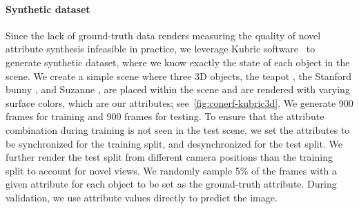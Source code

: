     \paragraph{Synthetic dataset}
      Since the lack of ground-truth data renders measuring the quality of
      novel attribute synthesis infeasible in practice, we leverage Kubric
      software~\cite{kubric2021github} to generate synthetic dataset, where we
      know exactly the state of each object in the scene.
      We create a simple scene where three 3D objects, the teapot
      \cite{teapot}, the Stanford bunny \cite{bunny}, and Suzanne
      \cite{suzanne}, are placed within the scene and are rendered with
      varying surface colors, which are our attributes;
      see~\cref{fig:conerf-kubric3d}.
      We generate 900 frames for training and 900 frames for testing.
      To ensure that the attribute combination during training is not seen in
      the test scene, we set the attributes to be synchronized for the
      training split, and desynchronized for the test split.
      We further render the test split from different camera positions than
      the training split to account for novel views.
      We randomly sample 5\% of the frames with a given attribute for each
      object to be set as the ground-truth attribute.
      During validation, we use attribute values directly to predict the
      image.

